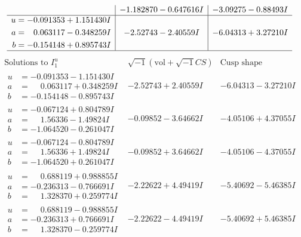 \documentclass[1p]{elsarticle_modified}
\theoremstyle{definition}
\newcommand{\I}{\sqrt{-1}}
\begin{document}
$$\begin{array}{c|c|c}
 & -1.182870 - 0.647616 I & -3.09275 - 0.88493 I \\ \hline\begin{aligned}
u &= -0.091353 + 1.151430 I \\
a &= \phantom{-}0.063117 - 0.348259 I \\
b &= -0.154148 + 0.895743 I\end{aligned}
 & -2.52743 - 2.40559 I & -6.04313 + 3.27210 I\\
 \hline 
 \end{array}$$\newpage$$\begin{array}{c|c|c}  
\text{Solutions to }I^u_{1}& \I (\text{vol} + \sqrt{-1}CS) & \text{Cusp shape}\\
 \hline 
\begin{aligned}
u &= -0.091353 - 1.151430 I \\
a &= \phantom{-}0.063117 + 0.348259 I \\
b &= -0.154148 - 0.895743 I\end{aligned}
 & -2.52743 + 2.40559 I & -6.04313 - 3.27210 I \\ \hline\begin{aligned}
u &= -0.067124 + 0.804789 I \\
a &= \phantom{-}1.56336 - 1.49824 I \\
b &= -1.064520 - 0.261047 I\end{aligned}
 & -0.09852 - 3.64662 I & -4.05106 + 4.37055 I \\ \hline\begin{aligned}
u &= -0.067124 - 0.804789 I \\
a &= \phantom{-}1.56336 + 1.49824 I \\
b &= -1.064520 + 0.261047 I\end{aligned}
 & -0.09852 + 3.64662 I & -4.05106 - 4.37055 I \\ \hline\begin{aligned}
u &= \phantom{-}0.688119 + 0.988855 I \\
a &= -0.236313 - 0.766691 I \\
b &= \phantom{-}1.328370 + 0.259774 I\end{aligned}
 & -2.22622 + 4.49419 I & -5.40692 - 5.46385 I \\ \hline\begin{aligned}
u &= \phantom{-}0.688119 - 0.988855 I \\
a &= -0.236313 + 0.766691 I \\
b &= \phantom{-}1.328370 - 0.259774 I\end{aligned}
 & -2.22622 - 4.49419 I & -5.40692 + 5.46385 I \\ \hline\begin{aligned}

\end{aligned}
\end{array}$$
\end{document}
